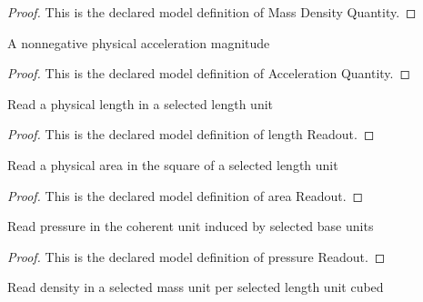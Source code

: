 \begin{proof}
  This is the declared model definition of Mass Density Quantity.
\end{proof}
\begin{definition}
  \label{def:physics:phyx-mini-0385:phyxminiproblems-problemphyxmini0385-accelerationquantity}
  A nonnegative physical acceleration magnitude
\end{definition}
\begin{proof}
  This is the declared model definition of Acceleration Quantity.
\end{proof}
\begin{definition}
  \label{def:physics:phyx-mini-0385:phyxminiproblems-problemphyxmini0385-lengthreadout}
  Read a physical length in a selected length unit
\end{definition}
\begin{proof}
  This is the declared model definition of length Readout.
\end{proof}
\begin{definition}
  \label{def:physics:phyx-mini-0385:phyxminiproblems-problemphyxmini0385-areareadout}
  Read a physical area in the square of a selected length unit
\end{definition}
\begin{proof}
  This is the declared model definition of area Readout.
\end{proof}
\begin{definition}
  \label{def:physics:phyx-mini-0385:phyxminiproblems-problemphyxmini0385-pressurereadout}
  Read pressure in the coherent unit induced by selected base units
\end{definition}
\begin{proof}
  This is the declared model definition of pressure Readout.
\end{proof}
\begin{definition}
  \label{def:physics:phyx-mini-0385:phyxminiproblems-problemphyxmini0385-densityreadout}
  Read density in a selected mass unit per selected length unit cubed
\end{definition}

